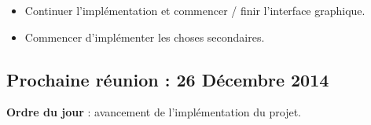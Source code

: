 \documentclass[12pt,a4paper]{article}
\begin{document}
\begin{itemize}[label = $\circledcirc$]
	\item Continuer l'implémentation et commencer / finir l'interface graphique.
	\item Commencer d'implémenter les choses secondaires.
\end{itemize}

\subsection*{Prochaine réunion : 26 Décembre 2014}

\textbf{Ordre du jour} : avancement de l'implémentation du projet.\\
\end{document}
